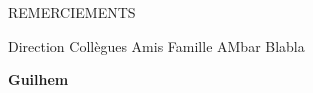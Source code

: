 
{}
{\centerline { {\sffamily \Large REMERCIEMENTS}}}

\vspace*{1cm}
\vskip 0.5cm
\noindent

Direction
Collègues
Amis
Famille
AMbar
Blabla


\vskip 0.3cm
\noindent
 \qquad  \qquad \qquad \qquad \qquad \qquad \qquad \qquad \quad \textbf{Guilhem}
